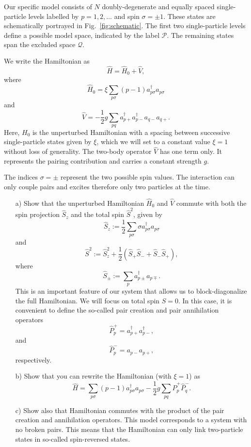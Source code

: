 \begin{prob}
  Our specific model consists of $N$ doubly-degenerate and equally
  spaced single-particle levels labelled by $p=1,2,\dots$ and spin
  $\sigma=\pm 1$.  These states are schematically portrayed in
  Fig.~\ref{fig:schematic}.  The first two single-particle levels
  define a possible model space, indicated by the label $\mathcal{P}$.
  The remaining states span the excluded space $\mathcal{Q}$.

  We write the Hamiltonian as
  \[ \hat{H} = \hat{H}_0 + \hat{V} , \]
  where
  \[
  \hat{H}_0=\xi\sum_{p\sigma}(p-1)a_{p\sigma}^{\dagger}a_{p\sigma}
  \]
  and
  \[
  \hat{V}=-\frac{1}{2}g\sum_{pq}a^{\dagger}_{p+}
  a^{\dagger}_{p-}a_{q-}a_{q+}.
  \]
  Here, $H_0$ is the unperturbed Hamiltonian with a spacing between
  successive single-particle states given by $\xi$, which we will set
  to a constant value $\xi=1$ without loss of generality. The two-body
  operator $\hat{V}$ has one term only. It represents the pairing
  contribution and carries a constant strength $g$.

  The indices $\sigma=\pm$ represent the two possible spin values. The
  interaction can only couple pairs and excites therefore only two
  particles at the time.


  \begin{enumerate}
  \item[a)] Show that the unperturbed Hamiltonian $\hat{H}_0$ and
    $\hat{V}$ commute with both the spin projection $\hat{S}_z$ and
    the total spin $\hat{S}^2$, given by
  \[
    \hat{S}_z := \frac{1}{2}\sum_{p\sigma} \sigma
    a^{\dagger}_{p\sigma}a_{p\sigma}
  \]
  and
  \[
    \hat{S}^2 := \hat{S}_z^2 + \frac{1}{2}(\hat{S}_+\hat{S}_- +
    \hat{S}_-\hat{S}_+),
  \]
  where
  \[
    \hat{S}_\pm := \sum_{p} a^{\dagger}_{p\pm} a_{p\mp}.
  \]
  This is an important feature of our system that allows us to
  block-diagonalize the full Hamiltonian. We will focus on total spin
  $S=0$.  In this case, it is convenient to define the so-called pair
  creation and pair annihilation operators
  \[
  \hat{P}^{+}_p = a^{\dagger}_{p+}a^{\dagger}_{p-},
  \]
  and
  \[
  \hat{P}^{-}_p = a_{p-}a_{p+},
  \]
  respectively.
  \item[b)] Show that you can rewrite the Hamiltonian (with $\xi=1$)
    as
  \[
  \hat{H}=\sum_{p\sigma}(p-1)a_{p\sigma}^{\dagger}a_{p\sigma}
  -\frac{1}{2}g\sum_{pq}\hat{P}^{+}_p\hat{P}^{-}_q.
  \]
  \item[c)] Show also that Hamiltonian commutes with the product of
    the pair creation and annihilation operators.  This model
    corresponds to a system with no broken pairs. This means that the
    Hamiltonian can only link two-particle states in so-called
    spin-reversed states.


\end{enumerate}
\end{prob}
